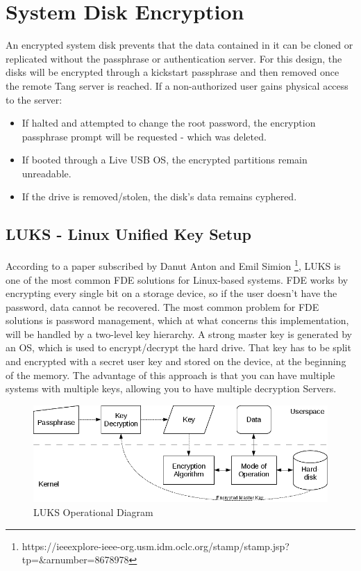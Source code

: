 \section{System Disk Encryption}
An encrypted system disk prevents that the data contained in it can be cloned or replicated without the passphrase or authentication server. For this design, the disks will be encrypted through a kickstart passphrase and then removed once the remote Tang server is reached. If a non-authorized user gains physical access to the server:
\begin{itemize}
  \item If halted and attempted to change the root password, the encryption passphrase prompt will be requested - which was deleted.
  \item If booted through a Live USB OS, the encrypted partitions remain unreadable.
  \item If the drive is removed/stolen, the disk's data remains cyphered.
\end{itemize}

\newpage
\subsection{LUKS - Linux Unified Key Setup}

According to a paper subscribed by Danut Anton and Emil Simion \footnote{https://ieeexplore-ieee-org.usm.idm.oclc.org/stamp/stamp.jsp?tp=\&arnumber=8678978}, LUKS is one of the most common FDE solutions for Linux-based systems.
FDE works by encrypting every single bit on a storage device, so if the user doesn't have the password, data cannot be recovered. The most common problem for FDE solutions is password management, which at what concerns this implementation, will be handled by a two-level key hierarchy. A strong master key is generated by an OS, which is used to encrypt/decrypt the hard drive. That key has to be split and encrypted with a secret user key and stored on the device, at the beginning of the memory. The advantage of this approach is that you can have multiple systems with multiple keys, allowing you to have multiple decryption Servers.

\vskip 2cm
\begin{figure}
  \includegraphics[width=14cm]{images/image2.png}
  \centering
  \caption{LUKS Operational Diagram}
\end{figure}

